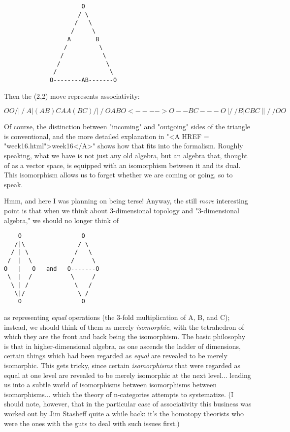 \begin{verbatim}
                      O
                     / \
                    /   \
                   /     \
                  A       B
                 /         \
                /           \
               /             \
              /               \
             O--------AB-------O
\end{verbatim}
    

Then the (2,2) move represents associativity:


$$
    O                   O
   /|\                 / \
  A | (AB)C           A   A(BC)
 /  |  \             /     \
O   AB  O   <---->  O--BC---O
 \  |  /             \     /
  B | C               B   C
   \|/                 \ /
    O                   O
$$
    

Of course, the distinction between "incoming" and "outgoing" sides of
the triangle is conventional, and the more detailed explanation in
"<A HREF = "week16.html">week16</A>" shows how that fits into the formalism.  
Roughly speaking, what
we have is not just any old algebra, but an algebra that, thought of as
a vector space, is equipped with an isomorphism between it and its
dual.   This isomorphism allows us to forget whether we are coming or
going, so to speak.

Hmm, and here I was planning on being terse!  Anyway, the still \emph{more}
interesting point is that when we think about 3-dimensional topology and
"3-dimensional algebra," we should no longer think of 


\begin{verbatim}
    O                 O
   /|\               / \
  / | \             /   \
 /  |  \           /     \
O   |   O   and   O-------O
 \  |  /           \     /
  \ | /             \   /
   \|/               \ /
    O                 O
\end{verbatim}
    

as representing \emph{equal} operations (the 3-fold multiplication of A, B,
and C); instead, we should think of them as merely \emph{isomorphic}, with
the tetrahedron of which they are the front and back being the
isomorphism.  The basic philosophy is that in higher-dimensional
algebra, as one ascends the ladder of dimensions, certain things which
had been regarded as \emph{equal} are revealed to be merely isomorphic.  This
gets tricky, since certain \emph{isomorphisms} that were regarded as equal 
at one level are revealed to be merely isomorphic at the next level...
leading us into a subtle world of isomorphisms between isomorphisms
between isomorphisms... which the theory of n-categories attempts to
systematize.  (I should note, however, that in the particular case of
associativity this business was worked out by Jim Stasheff quite a
while back: it's the homotopy theorists who were the ones with the guts
to deal with such issues first.)  

